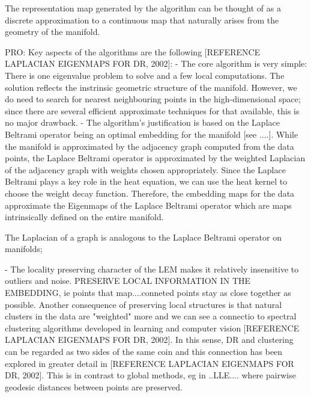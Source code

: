 \documentclass[journal, a4paper]{IEEEtran}
\begin{document}
The representation map generated by the algorithm can be thought of as a discrete approximation to a continuous map that naturally arises from the geometry of the manifold.


PRO:
Key aspects of the algorithms are the following [REFERENCE LAPLACIAN EIGENMAPS FOR DR, 2002]:
- The core algorithm is very simple: There is one eigenvalue problem to solve and a few local computations. The solution reflects the instrinsic geometric structure of the manifold. However, we do need to search for nearest neighbouring points in the high-dimensional space; since there are several efficient approximate techniques for that available, this is no major drawback.
- The algorithm's justification is based on the Laplace Beltrami operator being an optimal embedding for the manifold [see ....]. 
While the manifold is approximated by the adjacency graph computed from the data points, the Laplace Beltrami operator is approximated by the weighted Laplacian of the adjacency graph with weights chosen appropriately. %
Since the Laplace Beltrami plays a key role in the heat equation, we can use the heat kernel to choose the weight decay function. Therefore, the embedding maps for the data approximate the Eigenmaps of the Laplace Beltrami operator which are maps intrinsically defined on the entire manifold.

The Laplacian of a graph is analogous to the Laplace Beltrami operator on manifolds; 

- The locality preserving character of the LEM makes it relatively insensitive to outliers and noise. 
PRESERVE LOCAL INFORMATION IN THE EMBEDDING, ie points that map....conneted points stay as close together as possible.
Another consequence of preserving local structures  is that natural clusters in the data are "weighted" more and we can see a connectio to spectral clustering algorithms developed in learning and computer vision [REFERENCE LAPLACIAN EIGENMAPS FOR DR, 2002].
In this sense, DR and clustering can be regarded as two sides of the same coin and this connection has been explored in greater detail in [REFERENCE LAPLACIAN EIGENMAPS FOR DR, 2002]. 
This is in contrast to global methods, eg in ..LLE.... where pairwise geodesic distances between points are preserved.

\end{document}
